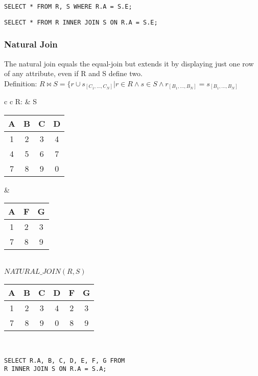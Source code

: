\lstset{language=SQL,tabsize=4,captionpos=b,frame=single,
basicstyle=\footnotesize}
\begin{lstlisting}[caption=SQL Equi-Join]
SELECT * FROM R, S WHERE R.A = S.E;
\end{lstlisting}
\begin{lstlisting}[caption=SQL Equi-Join]
SELECT * FROM R INNER JOIN S ON R.A = S.E;
\end{lstlisting}

\subsubsection{Natural Join}
The natural join equals the equal-join but extends it by displaying just one row
of any attribute, even if R and S define two.\\
Definition: $R \bowtie S = \{r \cup s_{[C_1, \dots, C_N]} | r \in R \land s \in S
\land r_{[B_1, \dots, B_N]} = s_{[B_1, \dots, B_N]}$

\begin{tabular}{ c c}
	R: & S \\
	\begin{tabular}{|c|c|c|c|}
		\hline
		A & B & C & D\\
		\hline
		1 & 2 & 3 & 4\\
		\hline
		4 & 5 & 6 & 7\\
		\hline
		7 & 8 & 9 & 0\\
		\hline
	\end{tabular} &

	\begin{tabular}{|c|c|c|}
		\hline
		A & F & G \\
		\hline
		1 & 2 & 3\\
		\hline
		7 & 8 & 9\\
		\hline
	\end{tabular}
\end{tabular}\\

$NATURAL\_JOIN(R,S)$ \\
\begin{tabular}{|c|c|c|c|c|c|}
	\hline
	A & B & C & D & F & G \\
	\hline
	1 & 2 & 3 & 4 & 2 & 3\\
	\hline
	7 & 8 & 9 & 0 & 8 & 9\\
	\hline
\end{tabular}\\

\lstset{language=SQL,tabsize=4,captionpos=b,frame=single,
basicstyle=\footnotesize}
\begin{lstlisting}[caption=SQL Natural-Join]
SELECT R.A, B, C, D, E, F, G FROM 
R INNER JOIN S ON R.A = S.A;
\end{lstlisting}

